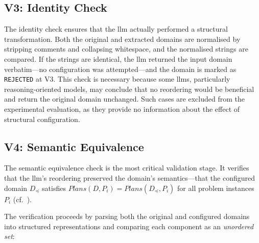 \subsection{V3: Identity Check}
\label{sec:design:v3_identity}

The identity check ensures that the \gls{llm} actually performed a structural transformation.
Both the original and extracted domains are normalised by stripping comments and collapsing whitespace, and the normalised strings are compared.
If the strings are identical, the \gls{llm} returned the input domain verbatim---no configuration was attempted---and the domain is marked as \texttt{REJECTED} at V3.
This check is necessary because some \glspl{llm}, particularly reasoning-oriented models, may conclude that no reordering would be beneficial and return the original domain unchanged.
Such cases are excluded from the experimental evaluation, as they provide no information about the effect of structural configuration.

\subsection{V4: Semantic Equivalence}
\label{sec:design:v4_semantic}

The semantic equivalence check is the most critical validation stage.
It verifies that the \gls{llm}'s reordering preserved the domain's semantics---that the configured domain $D_{\preceq}$ satisfies $\mathit{Plans}(D, P_i) = \mathit{Plans}(D_{\preceq}, P_i)$ for all problem instances~$P_i$ (cf.~).

The verification proceeds by parsing both the original and configured domains into structured representations and comparing each component as an \emph{unordered set}:

